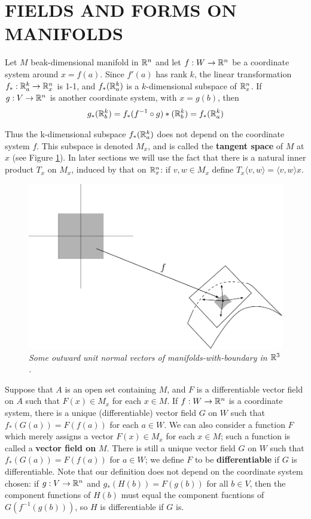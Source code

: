 \clearpage
\section{FIELDS AND FORMS ON MANIFOLDS}
Let $M$ beak-dimensional manifold in $\mathbb{R}^n$ and let $f: W\to \mathbb{R}^n$
be a coordinate system around $x = f(a)$. Since $f'(a)$ has rank $k$, 
the linear transformation $f_*:\mathbb{R}^k_a\to\mathbb{R}^n_x$ is 1-1, and $f_*(\mathbb{R}^k_a)$
is a $k$-dimensional subspace of $\mathbb{R}^n_x$. If $g:V\to\mathbb{R}^n$ is another coordinate
system, with $x=g(b)$, then 
\begin{align*}
    g_*(\mathbb{R}^k_b) = f_*(f^{-1}\circ g)*(\mathbb{R}^k_b) = f_*(\mathbb{R}^k_a)
\end{align*}

Thus the k-dimensional subspace $f_*(\mathbb{R}^k_a)$ does not depend on
the coordinate system $f$. This subspace is denoted $M_x$, and
is called the \textbf{tangent space} of $M$ at $x$ (see Figure \ref{Fig 5-5}).
In later sections we will use the fact that there is a natural inner
product $T_x$ on $M_x$, induced by that on $\mathbb{R}^n_x$: if $v,w\in M_x$ define
$T_x\langle v,w\rangle = \langle v,w\rangle x$.

\begin{figure}[!htb]
    \centering
    \includegraphics[width=.75\linewidth]{./pics/Fig5-5.pdf}
    \caption{\textit{Some outward unit normal vectors of manifolds-with-boundary in $\mathbb{R}^3$.}}
    \label{Fig 5-5}
\end{figure}

Suppose that $A$ is an open set containing $M$, and $F$ is a differentiable vector 
field on $A$ such that $F(x)\in M_x$ for each $x\in M$. If $f:W\to \mathbb{R}^n$ is a coordinate 
system, there is a unique (differentiable) vector field $G$ on $W$ such that 
$f_*(G(a)) = F(f(a))$ for each $a\in W$. We can also consider a function $F$ which merely assigns 
a vector $F(x)\in M_x$ for each $x\in M$; such a function is called a \textbf{vector field on} $M$. 
There is still a unique vector field $G$ on $W$ such that $f_*(G(a)) = F(f(a))$ for $a\in W$; we 
define $F$ to be \textbf{differentiable} if $G$ is differentiable. Note that our definition does not depend 
on the coordinate system chosen: if $g:V\to\mathbb{R}^n$ and $g_*(H(b))=F(g(b))$ for all $b\in V$, then the 
component functions of $H(b)$ must equal the component fucntions of $G(f^{-1}(g(b)))$, so $H$ is 
differentiable if $G$ is.

